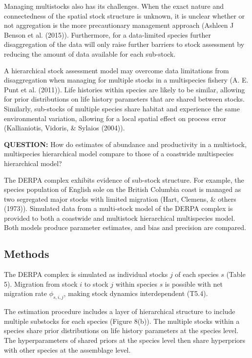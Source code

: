 \documentclass[12pt,]{scrartcl}
\begin{document}
Managing multistocks also has its challenges. When the exact nature and
connectedness of the spatial stock structure is unknown, it is unclear
whether or not aggregation is the more precautionary management approach
(Ashleen J Benson et al. (2015)). Furthermore, for a data-limited
species further disaggregation of the data will only raise further
barriers to stock assessment by reducing the amount of data available
for each sub-stock.

A hierarchical stock assessment model may overcome data limitations from
disaggregation when managing for multiple stocks in a multispecies
fishery (A. E. Punt et al. (2011)). Life histories within species are
likely to be similar, allowing for prior distributions on life history
parameters that are shared between stocks. Similarly, sub-stocks of
multiple species share habitat and experience the same environmental
variation, allowing for a local spatial effect on process error
(Kallianiotis, Vidoris, \& Sylaios (2004)).

\textbf{QUESTION:} How do estimates of abundance and productivity in a
multistock, multispecies hierarchical model compare to those of a
coastwide multispecies hierarchical model?

The DERPA complex exhibits evidence of sub-stock structure. For example,
the species population of English sole on the British Columbia coast is
managed as two segregated major stocks with limited migration (Hart,
Clemens, \& others (1973)). Simulated data from a multi-stock model of
the DERPA complex is provided to both a coastwide and multistock
hierarchical multispecies model. Both models produce parameter
estimates, and bias and precision are compared.

\subsection{Methods}\label{methods-1}

The DERPA complex is simulated as individual stocks \(j\) of each
species \(s\) (Table 5). Migration from stock \(i\) to stock \(j\)
within species \(s\) is possible with net migration rate
\(\phi_{s,i,j}\), making stock dynamics interdependent (T5.4).

The estimation procedure includes a layer of hierarchical structure to
include multiple substocks for each species (Figure 8(b)). The multiple
stocks within a species share prior distributions on life history
parameters at the species level. The hyperparameters of shared priors at
the species level then share hyperpriors with other species at the
assemblage level.
\end{document}
